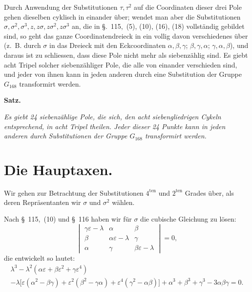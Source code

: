 \documentclass[12pt,a4paper]{article}
\begin{document}
Durch Anwendung der Substitutionen $\tau, \tau^2$ auf die Coordinaten dieser drei Pole gehen dieselben cyklisch in einander \"uber; wendet man aber die Substitutionen $\sigma, \sigma^2, \sigma^3, z, z\sigma, z\sigma^2, z\sigma^3$ an, die in \S.~115,~(5), (10), (16), (18) vollst\"andig gebildet sind, so geht das ganze Coordinatendreieck in ein vollig davon verschiedenes \"uber (z.~B. durch $\sigma$ in das Dreieck mit den Eckcoordinaten $\alpha, \beta, \gamma$; $\beta, \gamma, \alpha$; $\gamma, \alpha, \beta$), und daraus ist zu schliessen, dass diese Pole nicht mehr als siebenz\"ahlig sind. Es giebt acht Tripel solcher siebenz\"ahliger Pole, die alle von einander verschieden sind, und jeder von ihnen kann in jeden anderen durch eine Substitution der Gruppe $G_{168}$ transformirt werden.

\begin{center}\textbf{Satz.}\end{center}
\textit{Es giebt 24 siebenz\"ahlige Pole, die sich, den acht siebengliedrigen Cykeln entsprechend, in acht Tripel theilen. Jeder dieser 24 Punkte kann in jeden anderen durch Substitutionen der Gruppe $G_{168}$ transformirt werden.}

\newpage
\section{Die Hauptaxen.}
\label{sec:118}

Wir gehen zur Betrachtung der Substitutionen $4^{\text{ten}}$ und $2^{\text{ten}}$ Grades \"uber, als deren Repr\"asentanten wir $\sigma$ und $\sigma^2$ w\"ahlen.

Nach \S~115,~(10) und \S~116 haben wir f\"ur $\sigma$ die cubische Gleichung zu l\"osen:
\begin{equation}
\label{eq:hauptax1} \begin{vmatrix} \gamma\varepsilon - \lambda & \alpha & \beta \\ \beta & \alpha\varepsilon - \lambda & \gamma \\ \alpha & \gamma & \beta\varepsilon - \lambda \end{vmatrix} = 0,
\end{equation}
die entwickelt so lautet:
\begin{multline}
\label{eq:hauptax2} \lambda^3 - \lambda^2(\alpha\varepsilon + \beta\varepsilon^2 + \gamma\varepsilon^4)\\ - \lambda\bigl[\varepsilon(\alpha^2 - \beta\gamma) + \varepsilon^2(\beta^2 - \gamma\alpha) + \varepsilon^4(\gamma^2 - \alpha\beta)\bigr] + \alpha^3 + \beta^3 + \gamma^3 - 3\alpha\beta\gamma = 0.
\end{multline}
\end{document}
